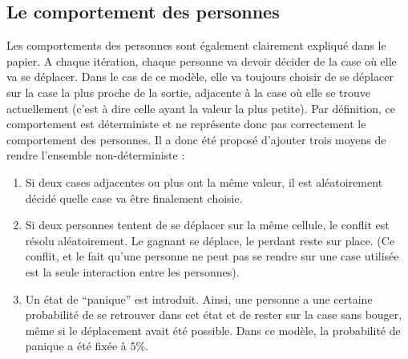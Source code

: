 	\subsection{Le comportement des personnes} 
	Les comportements des personnes sont également clairement expliqué dans le papier. A chaque itération, chaque personne va devoir décider de la case où elle va se déplacer. Dans le cas de ce modèle, elle va toujours choisir de se déplacer sur la case la plus proche de la sortie, adjacente à la case où elle se trouve actuellement (c'est à dire celle ayant la valeur la plus petite). Par définition, ce comportement est déterministe et ne représente donc pas correctement le comportement des personnes. Il a donc été proposé d'ajouter trois moyens de rendre l'ensemble non-déterministe :
	
	\begin{enumerate}
		\item Si deux cases adjacentes ou plus ont la même valeur, il est aléatoirement décidé quelle case va être finalement choisie.
		\item Si deux personnes tentent de se déplacer sur la même cellule, le conflit est résolu aléatoirement. Le gagnant se déplace, le perdant reste sur place. (Ce conflit, et le fait qu'une personne ne peut pas se rendre sur une case utilisée est la seule interaction entre les personnes).
		\item Un état de ``panique'' est introduit. Ainsi, une personne a une certaine probabilité de se retrouver dans cet état et de rester sur la case sans bouger, même si le déplacement avait été possible. Dans ce modèle, la probabilité de panique a été fixée à $5\%$.
	\end{enumerate}

	
	
	
	
	

